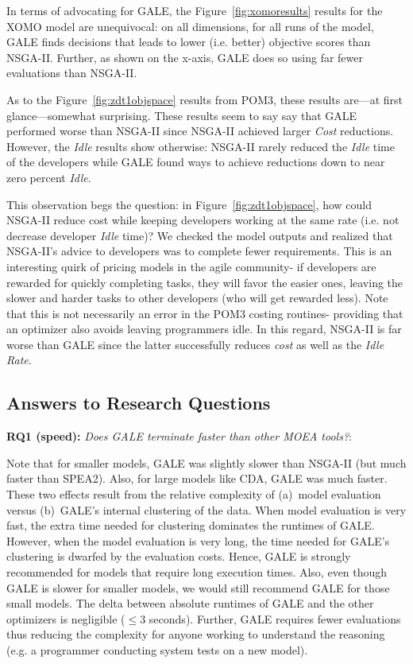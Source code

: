 \documentclass[10pt,journal,compsoc]{IEEEtran}
\newcommand{\fig}[1]{Figure~\ref{fig:#1}}
\newenvironment{changed}{\par}{\par}
\begin{document}
\begin{changed}
\noindent 
In terms of advocating for GALE,
the \fig{xomoresults} results for the XOMO model
are unequivocal: on all dimensions, for all runs of the model,
GALE finds decisions that leads to lower  (i.e.  better) objective scores than NSGA-II.
Further, as shown on the x-axis, GALE does so using far fewer evaluations than NSGA-II.
\end{changed}

As to the \fig{zdt1objspace} results from POM3, these results are---at first glance---somewhat surprising.
These results seem to say  say that GALE
performed worse than NSGA-II since NSGA-II achieved larger
{\em Cost} reductions. However, the {\em Idle}
results  show otherwise:
 NSGA-II rarely reduced
the {\em Idle} time of the developers  while GALE
found ways to achieve reductions down to near zero percent {\em Idle}.

This observation begs the question: in \fig{zdt1objspace},
how could NSGA-II reduce cost while keeping developers working at the same rate
(i.e. not decrease developer {\em
  Idle} time)?  We checked the model outputs
and realized that  NSGA-II's advice to developers was to
complete
fewer requirements. This is an interesting quirk of pricing models in the agile
community- if developers are rewarded for quickly completing tasks, they will
favor the easier ones, leaving the slower and harder tasks to other developers (who
will get rewarded less). 
Note that this is not necessarily an error in the  POM3 costing routines- providing 
that an optimizer also avoids leaving programmers idle.
In this regard, NSGA-II is far worse than GALE since the latter
successfully reduces {\em cost} as well as the {\em Idle Rate}.




\subsection{Answers to Research Questions}

{\bf RQ1 (speed):} {\em Does GALE terminate faster than other MOEA tools?}:

Note that 
for  smaller models, GALE was slightly slower than NSGA-II (but much faster than 
SPEA2). Also, for large models like CDA, GALE was much faster.
These two effects result from the relative complexity
of (a)~model evaluation versus (b)~GALE's internal clustering of the data.
When model evaluation is very fast, the extra time needed for clustering
dominates the runtimes of GALE.  However, when the
model evaluation is very long, the time
needed for GALE's clustering is dwarfed by the evaluation costs. Hence,
GALE is strongly recommended for models that require long execution times.
Also, even though GALE is slower for smaller models, we would still recommend GALE 
for those small models.
The delta between absolute runtimes of GALE and the other optimizers is negligible 
($\le 3$ seconds).
Further, GALE requires fewer evaluations thus reducing the complexity
for anyone working to understand the reasoning (e.g.  a
programmer conducting system tests on a new model).
\end{document}
